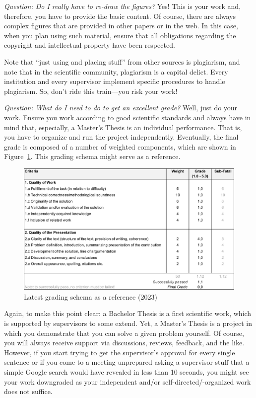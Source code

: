 \emph{Question: Do I really have to re-draw the figures?} Yes! This is your work and, therefore, you have to provide the basic content. Of course, there are always complex figures that are provided in other papers or in the web. In this case, when you plan using such material, ensure that all obligations regarding the copyright and intellectual property have been respected.

\begin{MySugg}
	Note that ``just using and placing stuff'' from other sources is plagiarism, and note that in the scientific community, plagiarism is a capital delict. Every institution and every supervisor implement specific procedures to handle plagiarism. So, don't ride this train---you risk your work!
\end{MySugg}

\emph{Question: What do I need to do to get an excellent grade?} Well, just do your work. Ensure you work according to good scientific standards and always have in mind that, especially, a Master's Thesis is an individual performance. That is, you have to organize and run the project independently. Eventually, the final grade is composed of a number of weighted components, which are shown in Figure~\ref{fig:gradingschema}. This grading schema might serve as a reference.

\begin{figure}[ht]
	\includegraphics[width=1.00\textwidth]{figs/grading.pdf}
	\caption{Latest grading schema as a reference (2023)}
	\label{fig:gradingschema}
\end{figure}

\begin{MySugg}
	Again, to make this point clear: a Bachelor Thesis is a first scientific work, which is supported by supervisors to some extend. Yet, a Master's Thesis is a project in which you demonstrate that you can solve a given problem yourself. Of course, you will always receive support via discussions, reviews, feedback, and the like. However, if you start trying to get the supervisor's approval for every single sentence or if you come to a meeting unprepared asking a supervisor stuff that a simple Google search would have revealed in less than 10 seconds, you might see your work downgraded as your independent and/or self-directed/-organized work does not suffice.
\end{MySugg}


